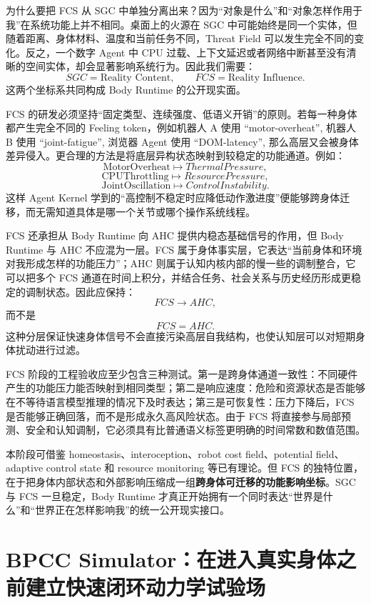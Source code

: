 为什么要把 FCS 从 SGC 中单独分离出来？因为“对象是什么”和“对象怎样作用于我”在系统功能上并不相同。桌面上的火源在 SGC 中可能始终是同一个实体，但随着距离、身体材料、温度和当前任务不同，Threat Field 可以发生完全不同的变化。反之，一个数字 Agent 中 CPU 过载、上下文延迟或者网络中断甚至没有清晰的空间实体，却会显著影响系统行为。因此我们需要：
\[
\boxed{
SGC=\text{Reality Content},
\qquad
FCS=\text{Reality Influence}.
}
\]
这两个坐标系共同构成 Body Runtime 的公开现实面。

FCS 的研发必须坚持“固定类型、连续强度、低语义开销”的原则。若每一种身体都产生完全不同的 Feeling token，例如机器人 A 使用 ``motor-overheat'', 机器人 B 使用 ``joint-fatigue'', 浏览器 Agent 使用 ``DOM-latency'', 那么高层又会被身体差异侵入。更合理的方法是将底层异构状态映射到较稳定的功能通道。例如：
\[
\text{MotorOverheat}
\mapsto
ThermalPressure,
\]
\[
\text{CPUThrottling}
\mapsto
ResourcePressure,
\]
\[
\text{JointOscillation}
\mapsto
ControlInstability.
\]
这样 Agent Kernel 学到的“高控制不稳定时应降低动作激进度”便能够跨身体迁移，而无需知道具体是哪一个关节或哪个操作系统线程。

FCS 还承担从 Body Runtime 向 AHC 提供内稳态基础信号的作用，但 Body Runtime 与 AHC 不应混为一层。FCS 属于身体事实层，它表达“当前身体和环境对我形成怎样的功能压力”；AHC 则属于认知内核内部的慢一些的调制整合，它可以把多个 FCS 通道在时间上积分，并结合任务、社会关系与历史经历形成更稳定的调制状态。因此应保持：
\[
FCS
\rightarrow
AHC,
\]
而不是
\[
FCS=AHC.
\]
这种分层保证快速身体信号不会直接污染高层自我结构，也使认知层可以对短期身体扰动进行过滤。

FCS 阶段的工程验收应至少包含三种测试。第一是跨身体通道一致性：不同硬件产生的功能压力能否映射到相同类型；第二是响应速度：危险和资源状态是否能够在不等待语言模型推理的情况下及时表达；第三是可恢复性：压力下降后，FCS 是否能够正确回落，而不是形成永久高风险状态。由于 FCS 将直接参与局部预测、安全和认知调制，它必须具有比普通语义标签更明确的时间常数和数值范围。

本阶段可借鉴 homeostasis、interoception、robot cost field、potential field、adaptive control state 和 resource monitoring 等已有理论。但 FCS 的独特位置，在于把身体内部状态和外部影响压缩成一组\textbf{跨身体可迁移的功能影响坐标}。SGC 与 FCS 一旦稳定，Body Runtime 才真正开始拥有一个同时表达“世界是什么”和“世界正在怎样影响我”的统一公开现实接口。

\section{BPCC Simulator：在进入真实身体之前建立快速闭环动力学试验场}

